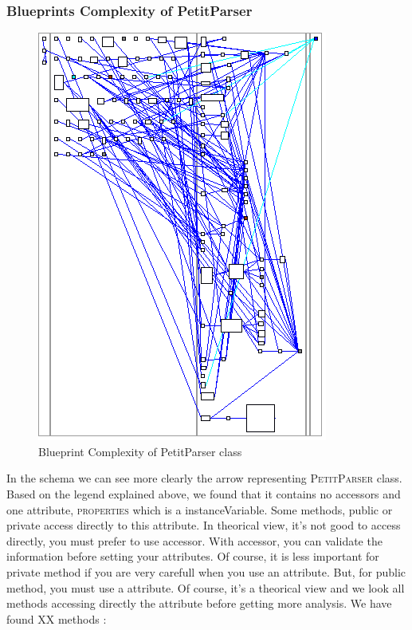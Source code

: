 \subsubsection{Blueprints Complexity of PetitParser}
\begin{figure}[ht]
\centering
\label{blueprint_pparser}
\includegraphics[scale=0.35]{blueprint_pparser.png}
\caption{Blueprint Complexity of PetitParser class}
\end{figure}
In the schema we can see more clearly the arrow representing \textsc{PetitParser} class.\\
Based on the legend explained above, we found that it contains no accessors and one attribute, \textsc{properties} which is a instanceVariable.  Some methods, public or private access directly to this attribute.  In theorical view, it's not good to access directly, you must prefer to use accessor.  With accessor, you can validate the information before setting your attributes.  Of course, it is less important for private method if you are very carefull when you use an attribute.  But, for public method, you must use a attribute.
Of course, it's a theorical view and we look all methods accessing directly the attribute before getting more analysis.  We have found XX methods : 
